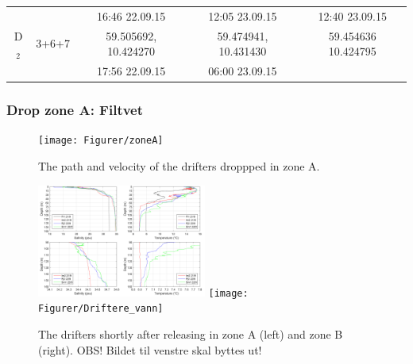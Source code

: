 \documentclass[12pt,a4paper,english]{article}
\begin{document}
\begin{table}[tb]
\begin{tabular}{|c|c|ccc|}
             &         & 16:46 22.09.15       & 12:05 23.09.15          & 12:40 23.09.15             \\
        D$_2$& 3+6+7   & 59.505692, 10.424270 & 59.474941, 10.431430    & 59.454636 10.424795        \\
             &         & 17:56 22.09.15       & 06:00 23.09.15          &                            \\ 
\hline 
\end{tabular}
\end{table}
\clearpage


\subsubsection{Drop zone A: Filtvet}
%
\begin{figure}[ht]
\centerline{
\texttt{[image: Figurer/zoneA]}}
\caption{\small
The path and velocity of the drifters droppped in zone A.%
}
\label{fig:ZoneA}
\end{figure}
%
%
\begin{figure}[ht]
\centerline{
\includegraphics*[width=0.495\textwidth]{Figurer/Fig_profiles}
\texttt{[image: Figurer/Driftere\_vann]}
}
\caption{\small
The drifters shortly after releasing in zone A (left) and zone B (right). OBS! Bildet til venstre skal byttes ut!
}
\label{fig:DriftereVann}
\end{figure}
\end{document}
